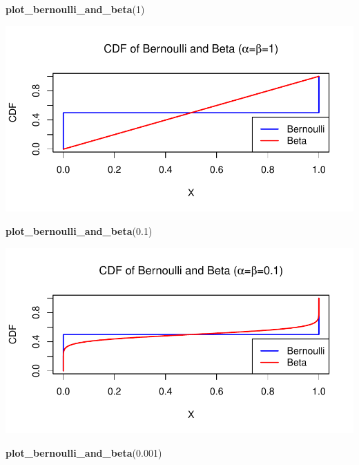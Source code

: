 \documentclass[
]{article}
\newenvironment{Shaded}{\begin{snugshade}}{\end{snugshade}}
\newcommand{\DecValTok}[1]{\textcolor[rgb]{0.00,0.00,0.81}{#1}}
\newcommand{\FloatTok}[1]{\textcolor[rgb]{0.00,0.00,0.81}{#1}}
\newcommand{\FunctionTok}[1]{\textcolor[rgb]{0.13,0.29,0.53}{\textbf{#1}}}
\newcommand{\NormalTok}[1]{#1}
\begin{document}
\begin{Shaded}
\begin{Highlighting}[]
\FunctionTok{plot\_bernoulli\_and\_beta}\NormalTok{(}\DecValTok{1}\NormalTok{)}
\end{Highlighting}
\end{Shaded}

\begin{center}\includegraphics{Homework-01-rmd-for-SMDS-2023-2024_files/figure-latex/unnamed-chunk-27-1} \end{center}

\begin{Shaded}
\begin{Highlighting}[]
\FunctionTok{plot\_bernoulli\_and\_beta}\NormalTok{(}\FloatTok{0.1}\NormalTok{)}
\end{Highlighting}
\end{Shaded}

\begin{center}\includegraphics{Homework-01-rmd-for-SMDS-2023-2024_files/figure-latex/unnamed-chunk-28-1} \end{center}

\begin{Shaded}
\begin{Highlighting}[]
\FunctionTok{plot\_bernoulli\_and\_beta}\NormalTok{(}\FloatTok{0.001}\NormalTok{)}
\end{Highlighting}
\end{Shaded}
\end{document}
